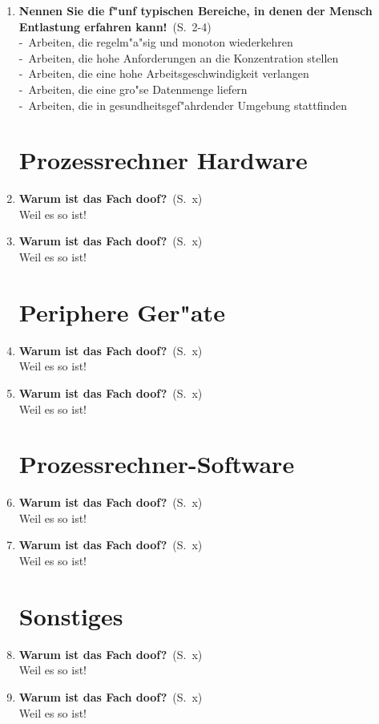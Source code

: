 \documentclass[a4paper,latin1,12pt]{article}
\newcommand{\question}[3]{\item {\textbf{#1?}}\ (S.\ #2)\\[2mm]#3}
\newcommand{\statement}[3]{\item {\textbf{#1!}}\ (S.\ #2)\\[2mm]#3}
\newcommand{\catchword}[1]{-\ #1\\}
\newcommand{\normaltext}[1]{#1\\}
\newcommand{\page}[1]{#1}
\newcommand{\pages}[2]{#1-#2}
\begin{document}
\begin{enumerate}
  \statement{Nennen Sie die f"unf typischen Bereiche,
             in denen der Mensch Entlastung erfahren kann}{\pages{2}{4}}
  {
    \catchword{Arbeiten, die regelm"a"sig und monoton wiederkehren}
    \catchword{Arbeiten, die hohe Anforderungen an die Konzentration stellen}
    \catchword{Arbeiten, die eine hohe Arbeitsgeschwindigkeit verlangen}
    \catchword{Arbeiten, die eine gro"se Datenmenge liefern}
    \catchword{Arbeiten, die in gesundheitsgef"ahrdender Umgebung stattfinden}
  }

  \newpage
  \section{Prozessrechner Hardware}

  \question{Warum ist das Fach doof}{\page{x}}
  {
    \normaltext{Weil es so ist!}
  }

  \question{Warum ist das Fach doof}{\page{x}}
  {
    \normaltext{Weil es so ist!}
  }

  \newpage
  \section{Periphere Ger"ate}

  \question{Warum ist das Fach doof}{\page{x}}
  {
    \normaltext{Weil es so ist!}
  }

  \question{Warum ist das Fach doof}{\page{x}}
  {
    \normaltext{Weil es so ist!}
  }

  \newpage
  \section{Prozessrechner-Software}

  \question{Warum ist das Fach doof}{\page{x}}
  {
    \normaltext{Weil es so ist!}
  }

  \question{Warum ist das Fach doof}{\page{x}}
  {
    \normaltext{Weil es so ist!}
  }

  \newpage
  \section{Sonstiges}

  \question{Warum ist das Fach doof}{\page{x}}
  {
    \normaltext{Weil es so ist!}
  }

  \question{Warum ist das Fach doof}{\page{x}}
  {
    \normaltext{Weil es so ist!}
  }

\end{enumerate}
\end{document}
